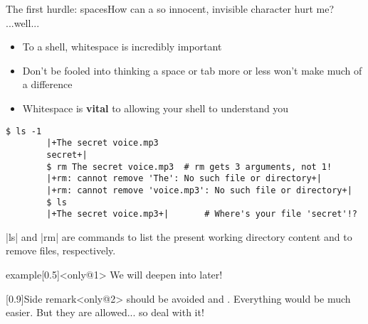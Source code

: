\begin{frame}[fragile]{The first hurdle: spaces}{How can a so innocent, invisible character hurt me? ...well...}
    \vspace{-3mm}
    \begin{itemize}
        \item To a shell, whitespace is incredibly important
        \item Don't be fooled into thinking a space or tab more or less won't make much of a difference
        \item  Whitespace is \textbf{vital} to allowing your shell to understand you
    \end{itemize}
    \begin{lstlisting}[style=MyBash, aboveskip=4mm]
        $ ls -1
        |+The secret voice.mp3
        secret+|
        $ rm The secret voice.mp3  # rm gets 3 arguments, not 1!
        |+rm: cannot remove 'The': No such file or directory+|
        |+rm: cannot remove 'voice.mp3': No such file or directory+|
        $ ls
        |+The secret voice.mp3+|       # Where's your file 'secret'!?
    \end{lstlisting}
    \centerline{\ssmall \bash|ls| and \bash|rm| are commands to list the present working directory content and to remove files, respectively.}
    \vspace{-3mm}
    \begin{overlayarea}{\textwidth}{0.3\textheight}
        \begin{varblock}{example}[0.5\textwidth]{}<only@1>
            We will deepen into  later!
        \end{varblock}
        \begin{varblock}{}[0.9\textwidth]{Side remark}<only@2>
             should be avoided and . Everything would be much easier. But they are allowed... so deal with it!
        \end{varblock}
    \end{overlayarea}
\end{frame}
